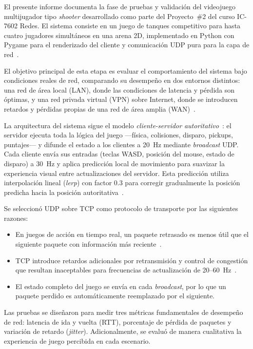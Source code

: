 \documentclass[conference]{IEEEtran}
\begin{document}
El presente informe documenta la fase de pruebas y validaci\'on del videojuego multijugador tipo \textit{shooter} desarrollado como parte del Proyecto~\#2 del curso IC-7602 Redes. El sistema consiste en un juego de tanques competitivo para hasta cuatro jugadores simult\'aneos en una arena 2D, implementado en Python con Pygame para el renderizado del cliente y comunicaci\'on UDP pura para la capa de red~\cite{tanenbaum2011,kurose2017}.

El objetivo principal de esta etapa es evaluar el comportamiento del sistema bajo condiciones reales de red, comparando su desempe\~no en dos entornos distintos: una red de \'area local (LAN), donde las condiciones de latencia y p\'erdida son \'optimas, y una red privada virtual (VPN) sobre Internet, donde se introducen retardos y p\'erdidas propias de una red de \'area amplia (WAN)~\cite{forouzan2012}.

La arquitectura del sistema sigue el modelo \textit{cliente-servidor autoritativo}~\cite{gambetta2018}: el servidor ejecuta toda la l\'ogica del juego ---f\'isica, colisiones, disparo, pickups, puntajes--- y difunde el estado a los clientes a 20~Hz mediante \textit{broadcast} UDP. Cada cliente env\'ia sus entradas (teclas WASD, posici\'on del mouse, estado de disparo) a 30~Hz y aplica predicci\'on local de movimiento para suavizar la experiencia visual entre actualizaciones del servidor. Esta predicci\'on utiliza interpolaci\'on lineal (\textit{lerp}) con factor 0.3 para corregir gradualmente la posici\'on predicha hacia la posici\'on autoritativa~\cite{gambetta2018}.

Se seleccion\'o UDP sobre TCP como protocolo de transporte por las siguientes razones:
\begin{itemize}
    \item En juegos de acci\'on en tiempo real, un paquete retrasado es menos \'util que el siguiente paquete con informaci\'on m\'as reciente~\cite{tanenbaum2011}.
    \item TCP introduce retardos adicionales por retransmisi\'on y control de congesti\'on que resultan inaceptables para frecuencias de actualizaci\'on de 20--60~Hz~\cite{kurose2017}.
    \item El estado completo del juego se env\'ia en cada \textit{broadcast}, por lo que un paquete perdido es autom\'aticamente reemplazado por el siguiente.
\end{itemize}

Las pruebas se dise\~naron para medir tres m\'etricas fundamentales de desempe\~no de red: latencia de ida y vuelta (RTT), porcentaje de p\'erdida de paquetes y variaci\'on de retardo (\textit{jitter}). Adicionalmente, se evalu\'o de manera cualitativa la experiencia de juego percibida en cada escenario.
\end{document}
